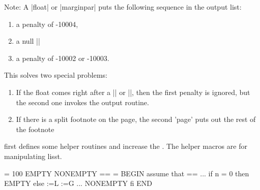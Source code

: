 Note: A |float| or |marginpar| puts the following sequence in the output
list: 

\begin{enumerate}
\item a penalty of -10004,

\item a null |\vbox|

\item a penalty of -10002 or -10003.
\end{enumerate}

This solves two special problems:

\begin{enumerate}
\item If the float comes right after a |\newpage| or |\clearpage|,
then the first penalty is ignored, but the second one
invokes the output routine.

\item If there is a split footnote on the page, the second 'page'
puts out the rest of the footnote
\end{enumerate}

\latex first defines some helper routines and increase the . The helper macros are for
manipulating lisst.

\begin{teX}
 \maxdeadcycles = 100
 \let\@elt\relax
 \def\@next#1#2#3#4{\ifx#2\@empty #4\else
   \expandafter\@xnext #2\@@#1#2#3\fi}
   \@next \CS \LIST {NONEMPTY}{EMPTY} == %
\@elt = \relax
 BEGIN assume that \LIST == \@elt {} ... \@elt \Bn
 if n = 0
 then EMPTY
 else 
   \CS :=L 
   \LIST :=G \@elt {} ... \@elt \Bn
   NONEMPTY
 fi
END
\end{teX}


\begin{teX}
11 \def\@xnext \@elt #1#2\@@#3#4{\def#3{#1}\gdef#4{#2}}

12 \def\@testfalse{\global\let\if@test\iffalse}
13 \def\@testtrue {\global\let\if@test\iftrue}
14 \@testfalse}
   }

15 \def\@bitor#1#2{\@testfalse {\let\@elt\@xbitor
16   \@tempcnta #1\relax #2}}

17 \def\@xbitor #1{\@tempcntb \count#1
18    \ifnum \@tempcnta =\z@
19    \else
20      \divide\@tempcntb\@tempcnta
21    \ifodd\@tempcntb \@testtrue\fi
22   \fi}
\end{teX}

